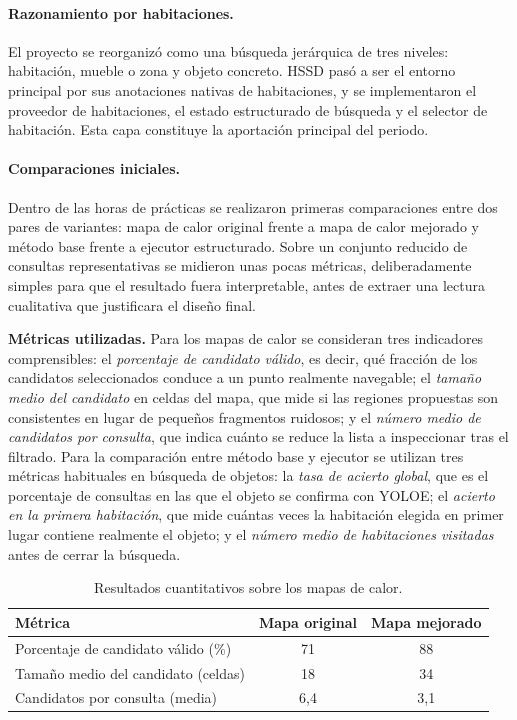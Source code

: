 \documentclass[11pt,fleqn,openany]{book} %
\begin{document}
\paragraph{Razonamiento por habitaciones.} El proyecto se reorganizó como una búsqueda jerárquica de tres niveles: habitación, mueble o zona y objeto concreto. HSSD pasó a ser el entorno principal por sus anotaciones nativas de habitaciones, y se implementaron el proveedor de habitaciones, el estado estructurado de búsqueda y el selector de habitación. Esta capa constituye la aportación principal del periodo.

\paragraph{Comparaciones iniciales.} Dentro de las horas de prácticas se realizaron primeras comparaciones entre dos pares de variantes: mapa de calor original frente a mapa de calor mejorado y método base frente a ejecutor estructurado. Sobre un conjunto reducido de consultas representativas se midieron unas pocas métricas, deliberadamente simples para que el resultado fuera interpretable, antes de extraer una lectura cualitativa que justificara el diseño final.

\medskip

\textbf{Métricas utilizadas.} Para los mapas de calor se consideran tres indicadores comprensibles: el \emph{porcentaje de candidato válido}, es decir, qué fracción de los candidatos seleccionados conduce a un punto realmente navegable; el \emph{tamaño medio del candidato} en celdas del mapa, que mide si las regiones propuestas son consistentes en lugar de pequeños fragmentos ruidosos; y el \emph{número medio de candidatos por consulta}, que indica cuánto se reduce la lista a inspeccionar tras el filtrado. Para la comparación entre método base y ejecutor se utilizan tres métricas habituales en búsqueda de objetos: la \emph{tasa de acierto global}, que es el porcentaje de consultas en las que el objeto se confirma con YOLOE; el \emph{acierto en la primera habitación}, que mide cuántas veces la habitación elegida en primer lugar contiene realmente el objeto; y el \emph{número medio de habitaciones visitadas} antes de cerrar la búsqueda.

\begin{table}[H]
\centering
\renewcommand{\arraystretch}{1.3}
\setlength{\tabcolsep}{6pt}
\begin{tabular}{>{\raggedright\arraybackslash}p{6.4cm}cc}
\toprule
\rowcolor{ocre!12}
\textbf{Métrica} & \textbf{Mapa original} & \textbf{Mapa mejorado}\\
\midrule
Porcentaje de candidato válido (\%)        & 71 & 88 \\
\midrule
Tamaño medio del candidato (celdas)        & 18 & 34 \\
\midrule
Candidatos por consulta (media)            & 6{,}4 & 3{,}1 \\
\bottomrule
\end{tabular}
\caption[Resultados cuantitativos sobre los mapas de calor.]{Resultados cuantitativos sobre los mapas de calor.}
\label{tab:cuant_mapa}
\end{table}
\end{document}
